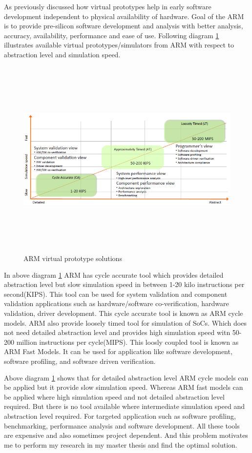 \par As previously discussed how virtual prototypes help in early software development independent to physical availability of hardware. Goal of the ARM is to provide pre-silicon software development and analysis with better analysis, accuracy, availability, performance and ease of use. Following diagram \ref{fig:arm_dig1} illustrates available virtual prototypes/simulators from ARM with respect to abstraction level and simulation speed.

\begin{figure}[h!]
\includegraphics[width=14cm, height=10cm]{./images/arm_dig1}
\centering
\caption{ARM virtual prototype solutions}
\label{fig:arm_dig1}
\end{figure}

\par In above diagram \ref{fig:arm_dig1} ARM has cycle accurate tool which provides detailed abstraction level but slow simulation speed in between 1-20 kilo instructions per second(KIPS). This tool can be used for system validation and component validation applications such as hardware/software co-verification, hardware validation, driver development. This cycle accurate tool is known as ARM cycle models. ARM also provide loosely timed tool for simulation of SoCs. Which does not need detailed abstraction level and provides high simulation speed witn 50-200 million instructions per cycle(MIPS). This loosly coupled tool is known as ARM Fast Models. It can be used for application like software development, software profiling, and software driven verification.

\par Above diagram \ref{fig:arm_dig1} shows that for detailed abstraction level ARM cycle models can be applied but it provide slow simulation speed. Whereas ARM fast models can be applied where high simulation speed and not detailed abstraction level required. But there is no tool available where intermediate simulation speed and abstraction level required. For targeted application such as software profiling, benchmarking, performance analysis and software development. All these tools are expensive and also sometimes project dependent. And this problem motivates me to perform my research in my master thesis and find the optimal solution.

